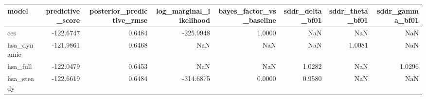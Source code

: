 \begin{tabular}{lrrrrrrr}
\toprule
model & predictive\_score & posterior\_predictive\_rmse & log\_marginal\_likelihood & bayes\_factor\_vs\_baseline & sddr\_delta\_bf01 & sddr\_theta\_bf01 & sddr\_gamma\_bf01 \\
\midrule
ces & -122.6747 & 0.6484 & -225.9948 & 1.0000 & NaN & NaN & NaN \\
hsa\_dynamic & -121.9861 & 0.6468 & NaN & NaN & NaN & 1.0081 & NaN \\
hsa\_full & -122.0479 & 0.6453 & NaN & NaN & 1.0282 & NaN & 1.0296 \\
hsa\_steady & -122.6619 & 0.6484 & -314.6875 & 0.0000 & 0.9580 & NaN & NaN \\
\bottomrule
\end{tabular}
